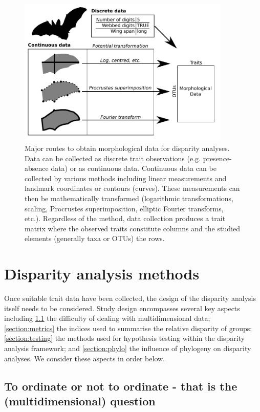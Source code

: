 \documentclass[12pt,letterpaper]{article}
\begin{document}
\begin{figure}[!htbp]
\centering
   \includegraphics[width=0.9\textwidth]{Figures/figure_data.pdf}
\caption{
   Major routes to obtain morphological data for disparity analyses. Data can be collected as discrete trait observations (e.g. presence-absence data) or as continuous data. 
   Continuous data can be collected by various methods including linear measurements and landmark coordinates or contours (curves).
   These measurements can then be mathematically transformed (logarithmic transformations, scaling, Procrustes superimposition, elliptic Fourier transforms, etc.).
   Regardless of the method, data collection produces a trait matrix where the observed traits constitute columns and the studied elements (generally taxa or OTUs) the rows. 
}
\label{Fig:data}
\end{figure}

\section{Disparity analysis methods} \label{section:methods}

\noindent Once suitable trait data have been collected, the design of the disparity analysis itself needs to be considered.
Study design encompasses several key aspects including \ref{section:ordination} the difficulty of dealing with multidimensional data; \ref{section:metrics} the indices used to summarise the relative disparity of groups; \ref{section:testing} the methods used for hypothesis testing within the disparity analysis framework; and \ref{section:phylo} the influence of phylogeny on disparity analyses.
We consider these aspects in order below.

\subsection{To ordinate or not to ordinate - that is the (multidimensional) question} \label{section:ordination}
\end{document}
